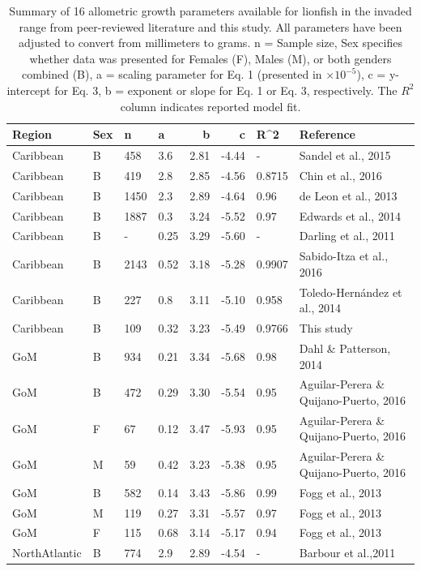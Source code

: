 \documentclass[fleqn,10pt,lineno]{wlpeerj} %
\begin{document}
\begin{table}

\caption{\label{tab:unnamed-chunk-5}\label{tab:all_params}Summary of 16 allometric growth parameters available for lionfish in the invaded range from peer-reviewed literature and this study. All parameters have been adjusted to convert from millimeters to grams. n = Sample size, Sex specifies whether data was presented for Females (F), Males (M), or both genders combined (B), a = scaling parameter for Eq. 1 (presented in $\times 10^{-5}$), c = y-intercept for Eq. 3, b = exponent or slope for Eq. 1 or Eq. 3, respectively. The $R^2$ column indicates reported model fit.}
\centering
\begin{tabular}[t]{llllrrll}
\toprule
Region & Sex & n & a & b & c & R\textasciicircum{}2 & Reference\\
\midrule
Caribbean & B & 458 & 3.6 & 2.81 & -4.44 & - & Sandel et al., 2015\\
Caribbean & B & 419 & 2.8 & 2.85 & -4.56 & 0.8715 & Chin et al., 2016\\
Caribbean & B & 1450 & 2.3 & 2.89 & -4.64 & 0.96 & de Leon et al., 2013\\
Caribbean & B & 1887 & 0.3 & 3.24 & -5.52 & 0.97 & Edwards et al., 2014\\
Caribbean & B & - & 0.25 & 3.29 & -5.60 & - & Darling et al., 2011\\
\addlinespace
Caribbean & B & 2143 & 0.52 & 3.18 & -5.28 & 0.9907 & Sabido-Itza et al., 2016\\
Caribbean & B & 227 & 0.8 & 3.11 & -5.10 & 0.958 & Toledo-Hernández et al., 2014\\
Caribbean & B & 109 & 0.32 & 3.23 & -5.49 & 0.9766 & This study\\
GoM & B & 934 & 0.21 & 3.34 & -5.68 & 0.98 & Dahl \& Patterson, 2014\\
GoM & B & 472 & 0.29 & 3.30 & -5.54 & 0.95 & Aguilar-Perera \& Quijano-Puerto, 2016\\
\addlinespace
GoM & F & 67 & 0.12 & 3.47 & -5.93 & 0.95 & Aguilar-Perera \& Quijano-Puerto, 2016\\
GoM & M & 59 & 0.42 & 3.23 & -5.38 & 0.95 & Aguilar-Perera \& Quijano-Puerto, 2016\\
GoM & B & 582 & 0.14 & 3.43 & -5.86 & 0.99 & Fogg et al., 2013\\
GoM & M & 119 & 0.27 & 3.31 & -5.57 & 0.97 & Fogg et al., 2013\\
GoM & F & 115 & 0.68 & 3.14 & -5.17 & 0.94 & Fogg et al., 2013\\
NorthAtlantic & B & 774 & 2.9 & 2.89 & -4.54 & - & Barbour et al.,2011\\
\bottomrule
\end{tabular}
\end{table}
\end{document}
